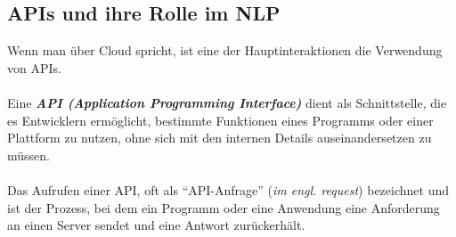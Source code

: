 \documentclass[12pt,a4paper]{article}
\begin{document}
\subsection{APIs und ihre Rolle im NLP}
Wenn man über Cloud spricht, ist eine der Hauptinteraktionen die Verwendung von APIs. 
\\ \\
Eine \textbf{\textit{API (Application Programming Interface)}} dient als Schnittstelle, die es Entwicklern ermöglicht, bestimmte Funktionen eines Programms oder einer Plattform zu nutzen, ohne sich mit den internen Details auseinandersetzen zu müssen. 
\\ \\
Das Aufrufen einer API, oft als \enquote{API-Anfrage} (\textit{im engl. request})  bezeichnet und ist der Prozess, bei dem ein Programm oder eine Anwendung eine Anforderung an einen Server sendet und eine Antwort zurückerhält.
\end{document}
